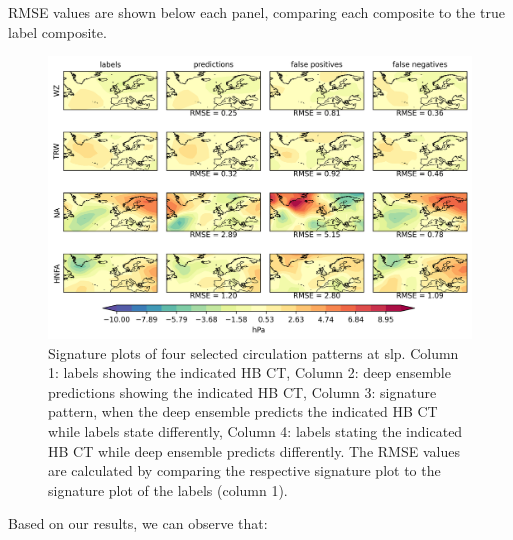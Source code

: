 \documentclass[
]{krantz}
\begin{document}
RMSE values are shown below each panel, comparing each composite to the true label composite.

\begin{figure}

{\centering \includegraphics[width=0.7\linewidth]{work/01-weatherpattern/figures/slp_signature_plots} 

}

\caption{Signature plots of four selected circulation patterns at slp. Column 1: labels showing the indicated HB CT, Column 2: deep ensemble predictions showing the indicated HB CT, Column 3: signature pattern, when the deep ensemble predicts the indicated HB CT while labels state differently, Column 4: labels stating the indicated HB CT while deep ensemble predicts differently. The RMSE values are calculated by comparing the respective signature plot to the signature plot of the labels (column 1).}\label{fig:sig}
\end{figure}

Based on our results, we can observe that:
\end{document}
